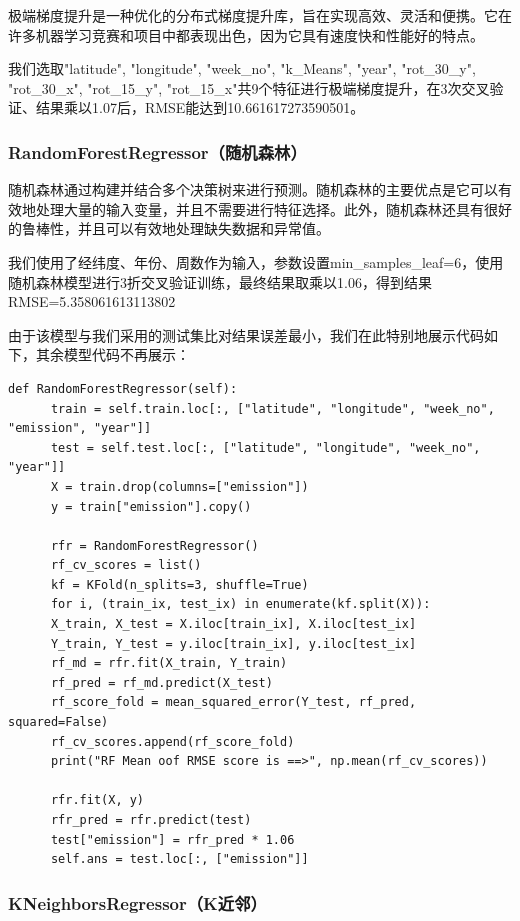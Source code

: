 \documentclass{ctexart}
\begin{document}
极端梯度提升是一种优化的分布式梯度提升库，旨在实现高效、灵活和便携。它在许多机器学习竞赛和项目中都表现出色，因为它具有速度快和性能好的特点。

我们选取"latitude", "longitude", "week\_no", "k\_Means", "year", "rot\_30\_y", "rot\_30\_x", "rot\_15\_y", "rot\_15\_x"共9个特征进行极端梯度提升，在3次交叉验证、结果乘以1.07后，RMSE能达到10.661617273590501。

\subsubsection{RandomForestRegressor（随机森林）}

随机森林通过构建并结合多个决策树来进行预测。随机森林的主要优点是它可以有效地处理大量的输入变量，并且不需要进行特征选择。此外，随机森林还具有很好的鲁棒性，并且可以有效地处理缺失数据和异常值。

我们使用了经纬度、年份、周数作为输入，参数设置min\_samples\_leaf=6，使用随机森林模型进行3折交叉验证训练，最终结果取乘以1.06，得到结果RMSE=5.358061613113802

由于该模型与我们采用的测试集比对结果误差最小，我们在此特别地展示代码如下，其余模型代码不再展示：

\begin{lstlisting}[style=Python]
def RandomForestRegressor(self):
      train = self.train.loc[:, ["latitude", "longitude", "week_no", "emission", "year"]]
      test = self.test.loc[:, ["latitude", "longitude", "week_no", "year"]]
      X = train.drop(columns=["emission"])
      y = train["emission"].copy()

      rfr = RandomForestRegressor()
      rf_cv_scores = list()
      kf = KFold(n_splits=3, shuffle=True)
      for i, (train_ix, test_ix) in enumerate(kf.split(X)):
      X_train, X_test = X.iloc[train_ix], X.iloc[test_ix]
      Y_train, Y_test = y.iloc[train_ix], y.iloc[test_ix]
      rf_md = rfr.fit(X_train, Y_train)
      rf_pred = rf_md.predict(X_test)
      rf_score_fold = mean_squared_error(Y_test, rf_pred, squared=False)
      rf_cv_scores.append(rf_score_fold)
      print("RF Mean oof RMSE score is ==>", np.mean(rf_cv_scores))

      rfr.fit(X, y)
      rfr_pred = rfr.predict(test)
      test["emission"] = rfr_pred * 1.06
      self.ans = test.loc[:, ["emission"]]
\end{lstlisting}

\subsubsection{KNeighborsRegressor（K近邻）}
\end{document}
